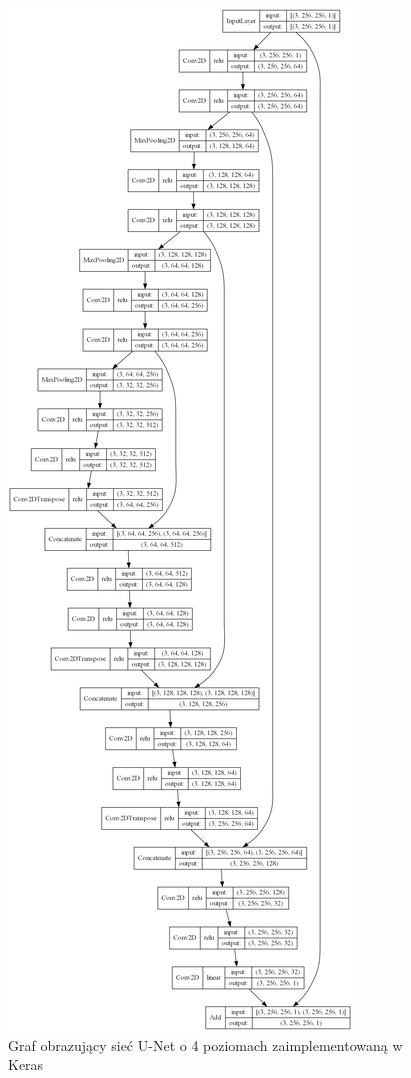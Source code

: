 \documentclass[a4paper, 12pt]{article}
\begin{document}
\begin{figure}[h!]
\begin{center}
	\includegraphics[height=0.95\paperheight]{model_plot.png}
	\caption{Graf obrazujący sieć U-Net o 4 poziomach zaimplementowaną w Keras}
\end{center}
\end{figure}
\end{document}
